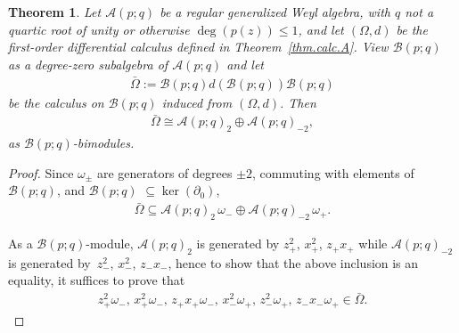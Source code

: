 \documentclass[pdftex]{sigma}
\numberwithin{equation}{section}
\newtheorem{Theorem}{Theorem}[section]
\def\Weyl#1#2{{\mathcal{B}}(#1;#2)}
\def\AWeyl#1#2{{\mathcal{A}}(#1;#2)}
\begin{document}
\begin{Theorem}\label{thm.calc.B}
Let $\AWeyl p q$ be a regular generalized Weyl algebra, with $q$ not a quartic root of unity or otherwise $\deg(p(z)) \leq 1$, and let $(\Omega ,d)$ be the first-order differential calculus defined in Theorem~{\rm \ref{thm.calc.A}}. View $\Weyl p q$ as a degree-zero subalgebra of $\AWeyl p q$ and let
\begin{gather*}
\bar\Omega := \Weyl p q d (\Weyl p q ) \Weyl p q
\end{gather*}
be the calculus on $\Weyl p q$ induced from $(\Omega ,d)$. Then
\begin{gather}\label{bomega}
\bar\Omega \cong \AWeyl p q_{2} \oplus \AWeyl p q_{-2},
\end{gather}
as $\Weyl p q$-bimodules.
\end{Theorem}
\begin{proof}
Since $\omega_\pm$ are generators of degrees $\pm 2$, commuting with elements of $\Weyl p q$, and $\Weyl p q$ $\subseteq \ker(\partial_0)$,
\begin{gather*}
\bar\Omega \subseteq \AWeyl p q_{2}\,\omega_- \oplus \AWeyl p q_{-2}\,\omega_+.
\end{gather*}

As a $\Weyl p q$-module, $ \AWeyl p q_{2}$ is generated by $z_+^2$, $x_+^2$, $z_+x_+$ while $ \AWeyl p q_{-2}$ is generated by~$z_-^2$, $x_-^2$, $z_-x_-$, hence to show that the above inclusion is an equality, it suf\/f\/ices to prove that
\begin{gather*}
z_+^2\omega_- ,\, x_+^2\omega_-,\, z_+x_+\omega_-,\,x_-^2 \omega_+,\, z_-^2\omega_+,\, z_-x_- \omega_+ \in \bar\Omega.
\end{gather*}


\end{proof}
\end{document}
